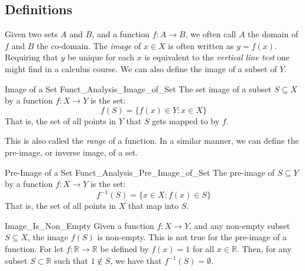         \subsection{Definitions}
            Given two sets $A$ and $B$, and a function
            $f:A\rightarrow{B}$, we often call $A$ the
            domain of $f$ and $B$ the co-domain.
            The \textit{image} of $x\in{X}$ is often written
            as $y=f(x)$. Requiring that $y$ be unique for each
            $x$ is equivalent to the \textit{vertical line test}
            one might find in a calculus course. We can also
            define the image of a subset of $Y$.
            \begin{ldefinition}{Image of a Set}
                  {Funct_Analysis_Image_of_Set}
                The \gls{set image} of a subset
                $S\subseteq{X}$ by a function
                $f:X\rightarrow{Y}$ is the set:
                \begin{equation}
                    f(S)=\{f(x)\in{Y}:x\in{X}\}
                \end{equation}
                That is, the set of all points in $Y$ that $S$
                gets mapped to by $f$.
            \end{ldefinition}
            This is also called the \textit{range} of a function.
            In a similar manner, we can define the pre-image, or
            inverse image, of a set.
            \begin{ldefinition}{Pre-Image of a Set}
                  {Funct_Analysis_Pre_Image_of_Set}
                The \gls{pre-image} of $S\subseteq{Y}$
                by a function $f:X\rightarrow{Y}$ is the set:
                \begin{equation}
                    f^{\minus{1}}(S)=\{x\in{X}:f(x)\in{S}\}
                \end{equation}
                That is, the set of all points in $X$ that map
                into $S$.
            \end{ldefinition}
            \begin{lexample}{}{Image_Is_Non_Empty}
                Given a function $f:X\rightarrow{Y}$, and any non-empty subset
                $S\subseteq{X}$, the image $f(S)$ is non-empty. This is not
                true for the pre-image of a function. For let
                $f:\mathbb{R}\rightarrow\mathbb{R}$ be defined by $f(x)=1$ for
                all $x\in\mathbb{R}$. Then, for any subset $S\subset\mathbb{R}$
                such that $1\notin{S}$, we have that
                $f^{\minus{1}}(S)=\emptyset$.
            \end{lexample}

